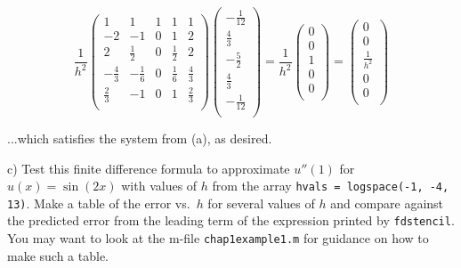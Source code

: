 \begin{solution}
    $$
    \frac{1}{h^2}
    \begin{pmatrix}
        1            &           1  & 1 &           1 & 1 \\
        -2           &           -1 & 0 &           1 & 2 \\
        2            & \frac{1}{2}  & 0 & \frac{1}{2} & 2 \\
        -\frac{4}{3} & -\frac{1}{6} & 0 & \frac{1}{6} & \frac{4}{3} \\
        \frac{2}{3}  &           -1 & 0 & 1           & \frac{2}{3} \\
    \end{pmatrix}
    \begin{pmatrix}
        -\frac{1}{12} \\
        \frac{4}{3} \\
        -\frac{5}{2} \\ 
        \frac{4}{3} \\
        -\frac{1}{12} \\
    \end{pmatrix}
        =
    \frac{1}{h^2}
    \begin{pmatrix}
        0 \\
        0 \\
        1 \\
        0 \\
        0 \\
    \end{pmatrix}
        =
    \begin{pmatrix}
        0 \\
        0 \\
        \frac{1}{h^2} \\
        0 \\
        0 \\
    \end{pmatrix}
    $$

    ...which satisfies the system from (a), as desired.

\end{solution}
\pagebreak

c)  Test this finite difference formula to approximate $u''(1)$ for $u(x) = \sin(2x)$ with values of $h$ from the array 
  \texttt{hvals = logspace(-1, -4, 13)}. Make a table of the error vs.\ $h$ for several values of $h$ and compare 
  against the predicted error from the leading term of the expression printed by \texttt{fdstencil}. You may want to 
  look at the m-file \texttt{chap1example1.m} for guidance on how to make such a table.

